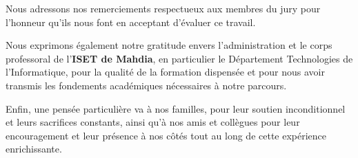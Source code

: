 \documentclass[a4paper,12pt,twoside]{report}
\begin{document}
\noindent
Nous adressons nos remerciements respectueux aux membres du jury pour l'honneur qu'ils nous font en acceptant d'évaluer ce travail.

\noindent
Nous exprimons également notre gratitude envers l'administration et le corps professoral de l'\textbf{ISET de Mahdia}, en particulier le Département Technologies de l'Informatique, pour la qualité de la formation dispensée et pour nous avoir transmis les fondements académiques nécessaires à notre parcours.

\noindent
Enfin, une pensée particulière va à nos familles, pour leur soutien inconditionnel et leurs sacrifices constants, ainsi qu'à nos amis et collègues pour leur encouragement et leur présence à nos côtés tout au long de cette expérience enrichissante.

\clearpage
\thispagestyle{preStyle}
\tableofcontents

\clearpage
\thispagestyle{preStyle}
\listoffigures

\thispagestyle{preStyle}
\listoftables
\clearpage



\clearpage
\pagestyle{mainStyle}
\setcounter{page}{1}









\clearpage
{}


\end{document}
